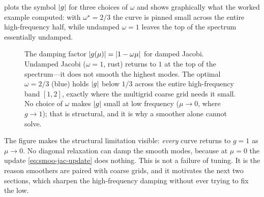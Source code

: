  plots the symbol $\lvert g\rvert$ for three choices of $\omega$
and shows graphically what the worked example computed: with $\omega^\star=2/3$ the
curve is pinned small across the entire high-frequency half, while undamped
$\omega=1$ leaves the top of the spectrum essentially undamped.

\begin{figure}[t]
\centering
{}
\caption[The Jacobi damping factor versus frequency]{The damping factor
$\lvert g(\mu)\rvert=\lvert1-\omega\mu\rvert$ for damped Jacobi. Undamped Jacobi ($\omega=1$,
rust) returns to $1$ at the top of the spectrum---it does not smooth the highest
modes. The optimal $\omega=2/3$ (blue) holds $\lvert g\rvert$ below $1/3$ across the entire
high-frequency band $[1,2]$, exactly where the multigrid coarse grid needs it small.
No choice of $\omega$ makes $\lvert g\rvert$ small at low frequency ($\mu\to0$, where
$g\to1$); that is structural, and it is why a smoother alone cannot solve.}
\label{fig:smoo-jacsymbol}
\end{figure}

The figure makes the structural limitation visible: \emph{every} curve returns to
$g=1$ as $\mu\to0$. No diagonal relaxation can damp the smooth modes, because at
$\mu=0$ the update \cref{eq:smoo-jac-update} does nothing. This is not a failure of
tuning. It is the reason smoothers are paired with coarse grids, and it motivates
the next two sections, which sharpen the high-frequency damping without ever trying
to fix the low.

